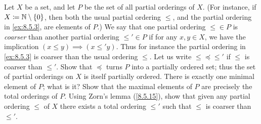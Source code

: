 \begin{ex}\label{ex:8.5.16}
  Let \(X\) be a set, and let \(P\) be the set of all partial orderings of \(X\).
  (For instance, if \(X \coloneqq \mathbb{N} \setminus \left\lbrace0\right\rbrace\), then both the usual partial ordering \(\leq\), and the partial ordering in \cref{ex:8.5.3}, are elements of \(P\).)
  We say that one partial ordering \(\leq \in P\) is \emph{coarser} than another partial ordering \(\leq' \in P\) if for any \(x, y \in X\), we have the implication \((x \leq y) \implies (x \leq' y)\).
  Thus for instance the partial ordering in \cref{ex:8.5.3} is coarser than the usual ordering \(\leq\).
  Let us write \(\leq \preceq \leq'\) if \(\leq\) is coarser than \(\leq'\).
  Show that \(\preceq\) turns \(P\) into a partially ordered set;
  thus the set of partial orderings on \(X\) is itself partially ordered.
  There is exactly one minimal element of \(P\);
  what is it?
  Show that the maximal elements of \(P\) are precisely the total orderings of \(P\).
  Using Zorn's lemma (\cref{8.5.15}), show that given any partial ordering \(\leq\) of \(X\) there exists a total ordering \(\leq'\) such that \(\leq\) is coarser than \(\leq'\).
\end{ex}

